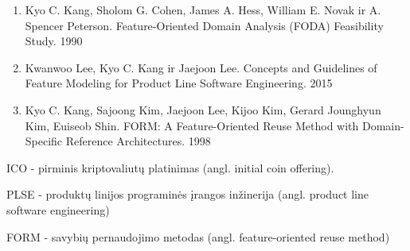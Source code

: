 \documentclass{VUMIFPSbakalaurinis}
\begin{document}
\begin{enumerate}[topsep=0pt,itemsep=-1ex,partopsep=1ex,parsep=1ex]
\item Kyo C. Kang, Sholom G. Cohen, James A. Hess, William E. Novak ir A. Spencer
Peterson. Feature-Oriented Domain Analysis (FODA) Feasibility Study. 1990
\item Kwanwoo Lee, Kyo C. Kang ir Jaejoon Lee. Concepts and Guidelines of Feature
Modeling for Product Line Software Engineering. 2015
\item Kyo C. Kang, Sajoong Kim, Jaejoon Lee, Kijoo Kim, Gerard Jounghyun Kim, Euiseob Shin. FORM: A Feature-Oriented Reuse Method with Domain-Specific Reference Architectures. 1998
\end{enumerate}

\printbibliography[heading=bibintoc] 


ICO - pirminis kriptovaliutų platinimas (angl. initial coin offering).

PLSE - produktų linijos programinės įrangos inžinerija (angl. product line software engineering)

FORM - savybių pernaudojimo metodas (angl. feature-oriented reuse method)
\end{document}
